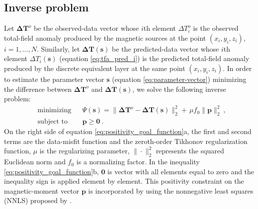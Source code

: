 \subsection{Inverse problem}

Let $\mathbf{\Delta T}^{o}$ be the observed-data vector whose $i$th element $\Delta T_{i}^{o}$
is the observed total-field anomaly produced by the magnetic sources at the point 
$(x_{i},y_{i},z_{i})$, $i = 1, \dots, N$. 
Similarly, let $\mathbf{\Delta T} (\mathbf{s})$ be the predicted-data vector whose $i$th element 
$\Delta T_{i}(\mathbf{s})$ (equation \ref{eq:tfa_pred_i}) is the predicted total-field anomaly  
produced by the discrete equivalent layer at the same point $(x_{i},y_{i},z_{i})$. 
In order to estimate the parameter vector $\mathbf{s}$ (equation \ref{eq:parameter-vector})
minimizing the difference between $\mathbf{\Delta T}^{o}$ and 
$\mathbf{\Delta T}(\mathbf{s})$, we solve the following inverse problem:
\begin{subequations}
	\begin{align}
	& \text{minimizing}
	& &\Psi(\mathbf{s}) =\lVert \mathbf{\Delta T}^{o} - \mathbf{\Delta T} (\mathbf{s}) 
	\rVert_{2}^{2} + \, \mu f_0 \parallel \mathbf{p} \parallel_{2}^{2} \: , \\
	& \text{subject to}
	& & \mathbf{p} \geqslant \mathbf{0} \: .
	\end{align}
	\label{eq:positivity_goal_function}
\end{subequations}
On the right side of equation \ref{eq:positivity_goal_function}a, the first and second terms are 
the data-misfit function and the zeroth-order Tikhonov regularization function, $\mu$ is the 
regularizing parameter, $\| \cdot \|_{2}^{2}$ represents the squared Euclidean norm and $f_0$ is a 
normalizing factor. In the inequality \ref{eq:positivity_goal_function}b, $\mathbf{0}$ is vector 
with all elements equal to zero and the inequality sign is applied element by element. This 
positivity constraint on the magnetic-moment vector $\mathbf{p}$ 
is incorporated by using the nonnegative least squares (NNLS) proposed by 
\cite{lawson_hanson_1974}. 

